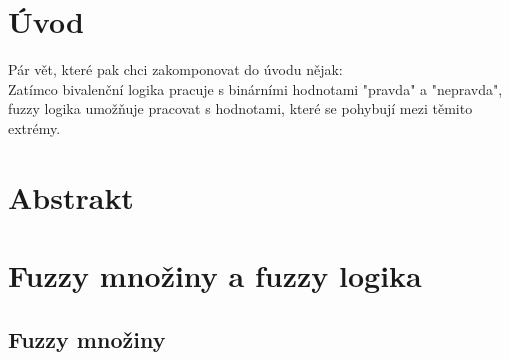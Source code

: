 


\newtheorem{definition}{Definice}
\newtheorem{remark}{Pozn\'amka}
\newtheorem{example}{Příklad}
\newtheorem{graph}{Obr\' azek}
\newtheorem{sentence}{Věta}
\newtheorem{tabul}{Tabulka}
\newcommand{\comment}[1]{}

\chapter{Úvod}

\color{blue} Pár vět, které pak chci zakomponovat do \'uvodu nějak:
                \\ 
                \color{black} Zatímco bivalenční logika pracuje s binárními hodnotami "pravda" a "nepravda", fuzzy logika umožňuje pracovat s hodnotami, které se pohybují mezi těmito extrémy.


\chapter{Abstrakt}
\label{abstrakt}




\chapter {Fuzzy mno\v ziny a fuzzy logika}
\section{Fuzzy mno\v ziny} 

\comment{
V klasické i fuzzy logice se často setkáváme se základními pojmy množina a prvek množiny. Množina se obecně vysvětluje jako souhrn, soubor nebo skupina objektů. Tyto objekty pak nazýváme prvky dané množiny. Nejvíce charakteristická vlastnost množin je, že je jednoznačně určena svými prvky, ale ignoruje jejich pořadí a další jejich struktury. Množina, která neobsahuje žádné prvky, se nazývá prázdná množina.
}

